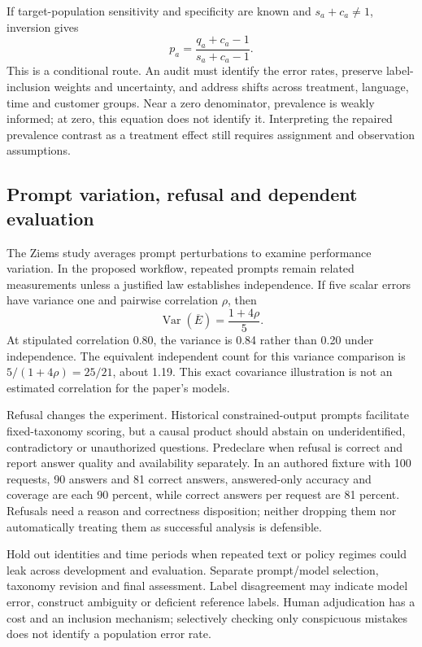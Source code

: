 If target-population sensitivity and specificity are known and $s_a+c_a\ne1$, inversion gives
\[
 p_a=\frac{q_a+c_a-1}{s_a+c_a-1}.
\]
This is a conditional route. An audit must identify the error rates, preserve label-inclusion weights and uncertainty, and address shifts across treatment, language, time and customer groups. Near a zero denominator, prevalence is weakly informed; at zero, this equation does not identify it. Interpreting the repaired prevalence contrast as a treatment effect still requires assignment and observation assumptions.~\citep{exec24_css_knowledge_reference}

\subsection{Prompt variation, refusal and dependent evaluation}
The Ziems study averages prompt perturbations to examine performance variation. In the proposed workflow, repeated prompts remain related measurements unless a justified law establishes independence. If five scalar errors have variance one and pairwise correlation $\rho$, then
\[
 \operatorname{Var}(\overline E)=\frac{1+4\rho}{5}.
\]
At stipulated correlation 0.80, the variance is 0.84 rather than 0.20 under independence. The equivalent independent count for this variance comparison is $5/(1+4\rho)=25/21$, about 1.19. This exact covariance illustration is not an estimated correlation for the paper's models.~\citep{exec24_css_original,exec24_css_knowledge_reference}

Refusal changes the experiment. Historical constrained-output prompts facilitate fixed-taxonomy scoring, but a causal product should abstain on underidentified, contradictory or unauthorized questions. Predeclare when refusal is correct and report answer quality and availability separately. In an authored fixture with 100 requests, 90 answers and 81 correct answers, answered-only accuracy and coverage are each 90 percent, while correct answers per request are 81 percent. Refusals need a reason and correctness disposition; neither dropping them nor automatically treating them as successful analysis is defensible.~\citep{exec24_css_original,exec24_css_knowledge_reference}

Hold out identities and time periods when repeated text or policy regimes could leak across development and evaluation. Separate prompt/model selection, taxonomy revision and final assessment. Label disagreement may indicate model error, construct ambiguity or deficient reference labels. Human adjudication has a cost and an inclusion mechanism; selectively checking only conspicuous mistakes does not identify a population error rate.~\citep{exec24_css_knowledge_reference}

